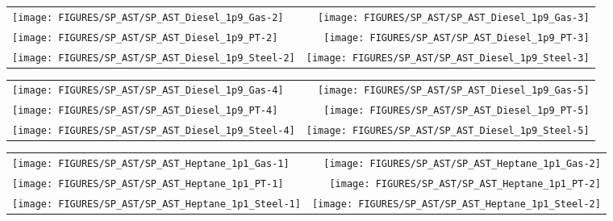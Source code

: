 \begin{figure}[p]
\begin{tabular*}{\textwidth}{l@{\extracolsep{\fill}}r}
\texttt{[image: FIGURES/SP\_AST/SP\_AST\_Diesel\_1p9\_Gas-2]}   &  \texttt{[image: FIGURES/SP\_AST/SP\_AST\_Diesel\_1p9\_Gas-3]}   \\
\texttt{[image: FIGURES/SP\_AST/SP\_AST\_Diesel\_1p9\_PT-2]}    &  \texttt{[image: FIGURES/SP\_AST/SP\_AST\_Diesel\_1p9\_PT-3]}    \\
\texttt{[image: FIGURES/SP\_AST/SP\_AST\_Diesel\_1p9\_Steel-2]} &  \texttt{[image: FIGURES/SP\_AST/SP\_AST\_Diesel\_1p9\_Steel-3]}
\end{tabular*}
\label{SP_Diesel_1p9_2m}
\end{figure}

\begin{figure}[p]
\begin{tabular*}{\textwidth}{l@{\extracolsep{\fill}}r}
\texttt{[image: FIGURES/SP\_AST/SP\_AST\_Diesel\_1p9\_Gas-4]}   &  \texttt{[image: FIGURES/SP\_AST/SP\_AST\_Diesel\_1p9\_Gas-5]}   \\
\texttt{[image: FIGURES/SP\_AST/SP\_AST\_Diesel\_1p9\_PT-4]}    &  \texttt{[image: FIGURES/SP\_AST/SP\_AST\_Diesel\_1p9\_PT-5]}    \\
\texttt{[image: FIGURES/SP\_AST/SP\_AST\_Diesel\_1p9\_Steel-4]} &  \texttt{[image: FIGURES/SP\_AST/SP\_AST\_Diesel\_1p9\_Steel-5]}
\end{tabular*}
\label{SP_Diesel_1p9_4m}
\end{figure}

\begin{figure}[p]
\begin{tabular*}{\textwidth}{l@{\extracolsep{\fill}}r}
\texttt{[image: FIGURES/SP\_AST/SP\_AST\_Heptane\_1p1\_Gas-1]}   &  \texttt{[image: FIGURES/SP\_AST/SP\_AST\_Heptane\_1p1\_Gas-2]}  \\
\texttt{[image: FIGURES/SP\_AST/SP\_AST\_Heptane\_1p1\_PT-1]}    &  \texttt{[image: FIGURES/SP\_AST/SP\_AST\_Heptane\_1p1\_PT-2]}   \\
\texttt{[image: FIGURES/SP\_AST/SP\_AST\_Heptane\_1p1\_Steel-1]} &  \texttt{[image: FIGURES/SP\_AST/SP\_AST\_Heptane\_1p1\_Steel-2]}
\end{tabular*}
\label{SP_Heptane_1p1_1m}
\end{figure}

